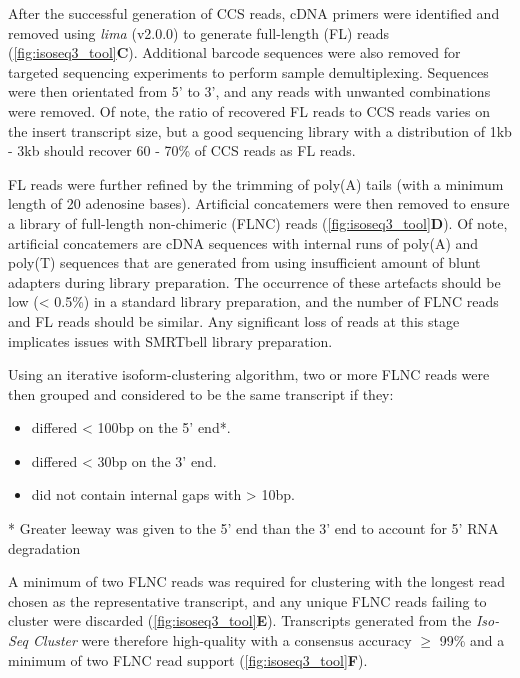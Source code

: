 After the successful generation of CCS reads, cDNA primers were identified and removed using \textit{lima} (v2.0.0) to generate full-length (FL) reads (\cref{fig:isoseq3_tool}\textbf{C}). Additional barcode sequences were also removed for targeted sequencing experiments to perform sample demultiplexing. Sequences were then orientated from 5’ to 3’, and any reads with unwanted combinations were removed. Of note, the ratio of recovered FL reads to CCS reads varies on the insert transcript size, but a good sequencing library with a distribution of 1kb - 3kb should recover 60 - 70\% of CCS reads as FL reads.   

FL reads were further refined by the trimming of poly(A) tails (with a minimum length of 20 adenosine bases). Artificial concatemers were then removed to ensure a library of full-length non-chimeric (FLNC) reads (\cref{fig:isoseq3_tool}\textbf{D}). Of note, artificial concatemers are cDNA sequences with internal runs of poly(A) and poly(T) sequences that are generated from using insufficient amount of blunt adapters during library preparation. The occurrence of these artefacts should be low (< 0.5\%) in a standard library preparation, and the number of FLNC reads and FL reads should be similar. Any significant loss of reads at this stage implicates issues with SMRTbell library preparation.

Using an iterative isoform-clustering algorithm, two or more FLNC reads were then grouped and considered to be the same transcript if they: 
\begin{itemize}
	\item differed < 100bp on the 5’ end*. 
	\item differed < 30bp on the 3’ end. 
	\item did not contain internal gaps with > 10bp.
\end{itemize}
* Greater leeway was given to the 5' end than the 3' end to account for 5' RNA degradation

A minimum of two FLNC reads was required for clustering with the longest read chosen as the representative transcript, and any unique FLNC reads failing to cluster were discarded (\cref{fig:isoseq3_tool}\textbf{E}). Transcripts generated from the \textit{Iso-Seq Cluster} were therefore high-quality with a consensus accuracy $\geq$ 99\% and a minimum of two FLNC read support (\cref{fig:isoseq3_tool}\textbf{F}). 

